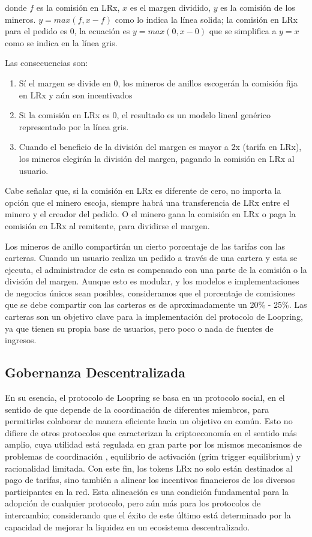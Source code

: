 \documentclass[UTF8,nofonts]{article}
\begin{document}
\begin{multicols}{2}
donde $f$ es la comisi\'on en LRx, $x$ es el margen dividido, $y$ es la comisi\'on de los mineros. $y=max(f, x-f)$ como lo indica la l\'inea solida; la comisi\'on en LRx para el pedido es $0$, la ecuaci\'on es  $y=max(0, x - 0)$ que se simplifica a $y=x$ como se indica en la l\'inea gris.

Las consecuencias son:
\begin{enumerate}
	\item 	S\'i el margen se divide en 0, los mineros de anillos escoger\'an la comisi\'on fija en LRx y a\'un son incentivados
	\item Si la comisi\'on en LRx es 0, el resultado es un modelo lineal gen\'erico representado por la l\'inea gris.
	\item Cuando el beneficio de la divisi\'on del margen es mayor a 2x (tarifa en LRx), los mineros elegir\'an la divisi\'on del margen, pagando la comisi\'on en LRx al usuario.
\end{enumerate}

Cabe se\~nalar que, si la comisi\'on en LRx es diferente de cero, no importa la opci\'on que el minero escoja, siempre habr\'a una transferencia de LRx entre el minero y el creador del pedido. O el minero gana la comisi\'on en LRx o paga la comisi\'on en LRx al remitente, para dividirse el margen.

Los mineros de anillo compartir\'an un cierto porcentaje de las tarifas con las carteras. Cuando un usuario realiza un pedido a trav\'es de una cartera y esta se ejecuta, el administrador de esta es compensado con una parte de la comisi\'on o la divisi\'on del margen. Aunque esto es modular,
y los modelos e implementaciones de negocios \'unicos sean posibles, consideramos que el porcentaje de comisiones que se debe compartir con las carteras es de aproximadamente un 20\% - 25\%. Las carteras son un objetivo clave para la implementaci\'on del protocolo de Loopring, ya que tienen su propia base de usuarios, pero poco o nada de fuentes de ingresos.


\subsection{Gobernanza Descentralizada}
En su esencia, el protocolo de Loopring se basa en un protocolo social, en el sentido de que depende de la coordinaci\'on de diferentes miembros, para permitirles colaborar de manera eficiente hacia un objetivo en com\'un. Esto no difiere de otros protocolos que caracterizan la criptoeconom\'ia en el sentido m\'as amplio, cuya utilidad est\'a regulada en gran parte por los mismos mecanismos de problemas de coordinaci\'on \cite{vitalikgovernance}, equilibrio de activaci\'on (grim trigger equilibrium) y racionalidad limitada. Con este fin, los tokens LRx no solo est\'an destinados al pago de tarifas, sino tambi\'en a alinear los incentivos financieros de los diversos participantes en la red. Esta alineaci\'on es una condici\'on fundamental para la adopci\'on de cualquier protocolo, pero a\'un m\'as para los protocolos de intercambio; considerando que el \'exito de este \'ultimo est\'a determinado por la capacidad de mejorar la liquidez en un ecosistema descentralizado. 


\end{multicols}
\end{document}

